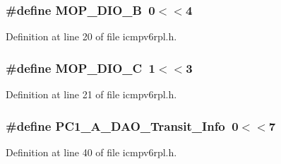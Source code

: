 \subsubsection[{\texorpdfstring{M\+O\+P\+\_\+\+D\+I\+O\+\_\+B}{MOP_DIO_B}}]{\setlength{\rightskip}{0pt plus 5cm}\#define M\+O\+P\+\_\+\+D\+I\+O\+\_\+B~0$<$$<$4}\hypertarget{group___i_c_m_pv6_r_p_l_ga68b9b921efc360503f32f9b2f31b064a}{}\label{group___i_c_m_pv6_r_p_l_ga68b9b921efc360503f32f9b2f31b064a}


Definition at line 20 of file icmpv6rpl.\+h.

\subsubsection[{\texorpdfstring{M\+O\+P\+\_\+\+D\+I\+O\+\_\+C}{MOP_DIO_C}}]{\setlength{\rightskip}{0pt plus 5cm}\#define M\+O\+P\+\_\+\+D\+I\+O\+\_\+C~1$<$$<$3}\hypertarget{group___i_c_m_pv6_r_p_l_ga70ade50f3dfe2b0767fa0ef979dea533}{}\label{group___i_c_m_pv6_r_p_l_ga70ade50f3dfe2b0767fa0ef979dea533}


Definition at line 21 of file icmpv6rpl.\+h.

\subsubsection[{\texorpdfstring{P\+C1\+\_\+\+A\+\_\+\+D\+A\+O\+\_\+\+Transit\+\_\+\+Info}{PC1_A_DAO_Transit_Info}}]{\setlength{\rightskip}{0pt plus 5cm}\#define P\+C1\+\_\+\+A\+\_\+\+D\+A\+O\+\_\+\+Transit\+\_\+\+Info~0$<$$<$7}\hypertarget{group___i_c_m_pv6_r_p_l_ga278d0adaa18c164bf954fcbe111b937b}{}\label{group___i_c_m_pv6_r_p_l_ga278d0adaa18c164bf954fcbe111b937b}


Definition at line 40 of file icmpv6rpl.\+h.

